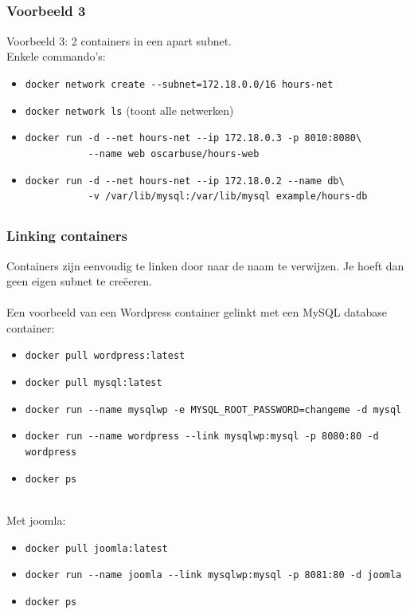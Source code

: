 \subsection{}
\begin{styleframefrag}
    \frametitle{Voorbeeld 3}
Voorbeeld 3: 2 containers in een apart subnet.\\
\pause
Enkele commando's:
\tiny
\begin{itemize}
	\item \verb!docker network create --subnet=172.18.0.0/16 hours-net!
	\pause
	\item \verb!docker network ls! (toont alle netwerken)
	\pause
	\item \verb!docker run -d --net hours-net --ip 172.18.0.3 -p 8010:8080\!\\
          \verb!           --name web oscarbuse/hours-web!
	\pause
	\item \verb!docker run -d --net hours-net --ip 172.18.0.2 --name db\!\\
		  \verb!           -v /var/lib/mysql:/var/lib/mysql example/hours-db!
\end{itemize}
\end{styleframefrag}

\subsection{}
\begin{styleframefrag}
    \frametitle{Linking containers}
\pause
Containers zijn eenvoudig te linken door naar de naam te verwijzen. Je hoeft dan geen eigen subnet te cre\"{e}eren.\\
\pause
~\\
Een voorbeeld van een Wordpress container gelinkt met een MySQL database container:
\tiny
\begin{itemize}
	\item \verb!docker pull wordpress:latest!
	\item \verb!docker pull mysql:latest!
	\item \verb!docker run --name mysqlwp -e MYSQL_ROOT_PASSWORD=changeme -d mysql!
	\item \verb!docker run --name wordpress --link mysqlwp:mysql -p 8080:80 -d wordpress!
	\item \verb!docker ps!
\end{itemize}
\pause
~\\

\small
Met joomla:
\tiny
\begin{itemize}
	\item \verb!docker pull joomla:latest!
	\item \verb!docker run --name joomla --link mysqlwp:mysql -p 8081:80 -d joomla!
	\item \verb!docker ps!
\end{itemize}

\end{styleframefrag}


